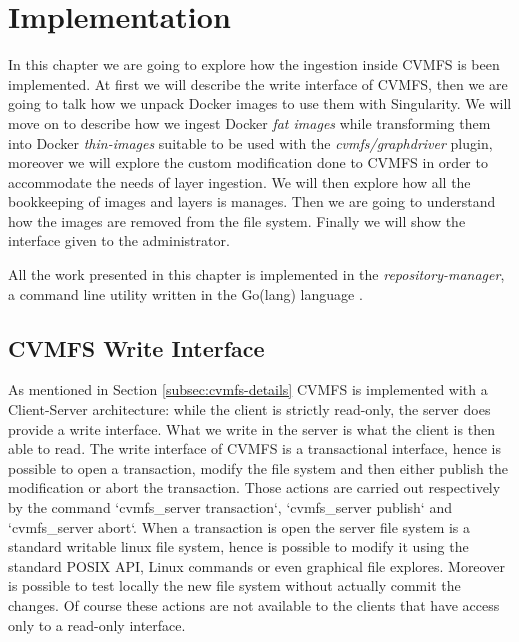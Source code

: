 \chapter{Implementation}\label{ch:Implementation}

In this chapter we are going to explore how the ingestion inside CVMFS is been
implemented. At first we will describe the write interface of CVMFS, then we
are going to talk how we unpack Docker images to use them with Singularity. We
will move on to describe how we ingest Docker \textit{fat images} while
transforming them into Docker \textit{thin-images} suitable to be used with the
\textit{cvmfs/graphdriver} plugin, moreover we will explore the custom
modification done to CVMFS in order to accommodate the needs of layer
ingestion. We will then explore how all the bookkeeping of images and layers is
manages.  Then we are going to understand how the images are removed from the
file system. Finally we will show the interface given to the administrator.

All the work presented in this chapter is implemented in the
\textit{repository-manager}, a command line utility written in the Go(lang)
language \cite{repository-manager}.

\section{CVMFS Write Interface}

As mentioned in Section \ref{subsec:cvmfs-details} CVMFS is implemented with a
Client-Server architecture: while the client is strictly read-only, the server
does provide a write interface. What we write in the server is what the client
is then able to read.  The write interface of CVMFS is a transactional
interface, hence is possible to open a transaction, modify the file system and
then either publish the modification or abort the transaction. Those actions
are carried out respectively by the command `cvmfs\_server transaction`,
`cvmfs\_server publish` and `cvmfs\_server abort`.  When a transaction is open
the server file system is a standard writable linux file system, hence is
possible to modify it using the standard POSIX API, Linux commands or even
graphical file explores.  Moreover is possible to test locally the new file
system without actually commit the changes. Of course these actions are not
available to the clients that have access only to a read-only interface. 

